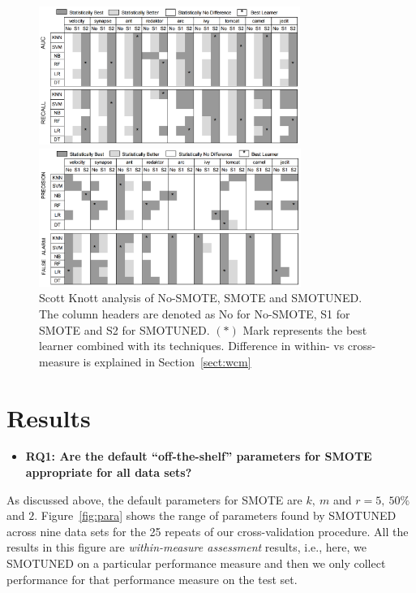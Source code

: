 \documentclass[sigconf,review, anonymous]{acmart}
\newcommand{\bi}{\begin{itemize}[leftmargin=0.4cm]}
\newcommand{\ei}{\end{itemize}}
\theoremstyle{break}
\theoremstyle{break}
\newcommand{\sma}{{\sc SMOTE}}
\newcommand{\smb}{{\sc SMOTUNED}}
\begin{document}
\begin{figure}[!t]
\begin{minipage}{.49\linewidth}
\centering
        \includegraphics[width=0.9\linewidth,height=4.5cm ]{./fig/AUC_recall.png}
            \end{minipage}%
\begin{minipage}{.49\linewidth}
        \centering
        \includegraphics[width=0.9\linewidth,height=4.5cm]{./fig/prec_pf.png}
    \end{minipage}%
    \caption{Scott Knott analysis of No-SMOTE, SMOTE and SMOTUNED. The column headers are denoted as No for No-SMOTE, S1 for SMOTE and S2 for SMOTUNED. $(\ast)$ Mark represents the best learner combined with its techniques. Difference in within- vs cross-measure is explained in Section~\ref{sect:wcm}}
    \label{fig:stats}
\end{figure}

\section{Results}
\label{sect:results}

\bi
 \item {\bf RQ1: Are the default ``off-the-shelf'' parameters for SMOTE appropriate for all
 data sets?}
 \ei
 
 As discussed above, the default parameters for
 {\sma} are $k,\ m$ and $r = 5,\ 50\%$ and $2$.
  Figure~\ref{fig:para} shows the range of parameters
 found by {\smb} across  nine data sets for the 25 repeats of our cross-validation procedure.
 All the results in this figure are {\em within-measure assessment} results, i.e.,
 here, we {\smb}  on a particular performance measure and then we only collect performance for that performance measure on the test set.
 
\end{document}
